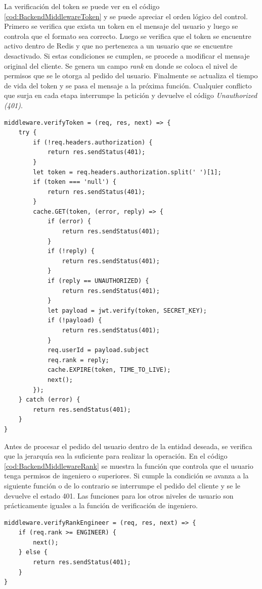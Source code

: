 La verificación del token se puede ver en el código \ref{cod:BackendMiddlewareToken} y se puede apreciar el orden lógico del control.
Primero se verifica que exista un token en el mensaje del usuario y luego se controla que el formato sea correcto.
Luego se verifica que el token se encuentre activo dentro de Redis y que no pertenezca a un usuario que se encuentre desactivado.
Si estas condiciones se cumplen, se procede a modificar el mensaje original del cliente.
Se genera un campo \emph{rank} en donde se coloca el nivel de permisos que se le otorga al pedido del usuario.
Finalmente se actualiza el tiempo de vida del token y se pasa el mensaje a la próxima función.
Cualquier conflicto que surja en cada etapa interrumpe la petición y devuelve el código \emph{Unauthorized (401)}.

\begin{lstlisting}[label=cod:BackendMiddlewareToken,caption=Verificación de token]
middleware.verifyToken = (req, res, next) => {
    try {
        if (!req.headers.authorization) {
            return res.sendStatus(401);
        }
        let token = req.headers.authorization.split(' ')[1];
        if (token === 'null') {
            return res.sendStatus(401);
        }
        cache.GET(token, (error, reply) => {
            if (error) {
                return res.sendStatus(401);
            }
            if (!reply) {
                return res.sendStatus(401);
            }
            if (reply == UNAUTHORIZED) {
                return res.sendStatus(401);
            }
            let payload = jwt.verify(token, SECRET_KEY);
            if (!payload) {
                return res.sendStatus(401);
            }
            req.userId = payload.subject
            req.rank = reply;
            cache.EXPIRE(token, TIME_TO_LIVE);
            next();
        });
    } catch (error) {
        return res.sendStatus(401);
    }
}
\end{lstlisting}

Antes de procesar el pedido del usuario dentro de la entidad deseada, se verifica que la jerarquía sea la suficiente para realizar la operación.
En el código \ref{cod:BackendMiddlewareRank} se muestra la función que controla que el usuario tenga permisos de ingeniero o superiores.
Si cumple la condición se avanza a la siguiente función o de lo contrario se interrumpe el pedido del cliente y se le devuelve el estado 401.
Las funciones para los otros niveles de usuario son prácticamente iguales a la función de verificación de ingeniero.

\begin{lstlisting}[label=cod:BackendMiddlewareRank,caption=Verificación de rango]
middleware.verifyRankEngineer = (req, res, next) => {
    if (req.rank >= ENGINEER) {
        next();
    } else {
        return res.sendStatus(401);
    }
}
\end{lstlisting}

